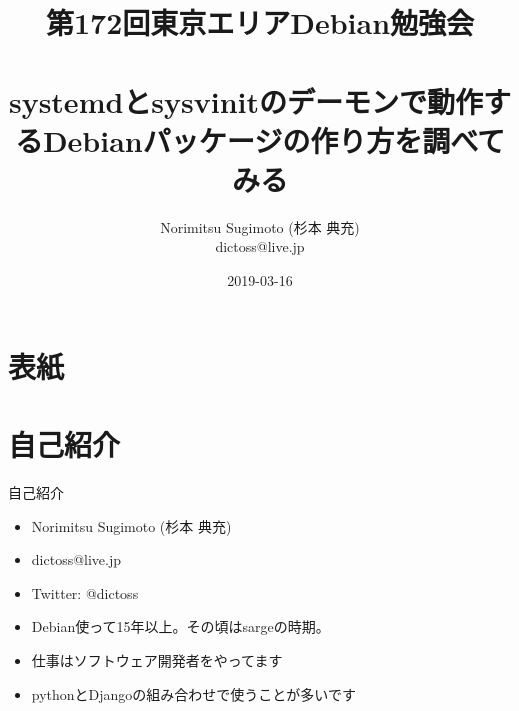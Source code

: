 \title{第172回東京エリアDebian勉強会 \\　\\systemdとsysvinitのデーモンで動作するDebianパッケージの作り方を調べてみる}
\subtitle{}
\author{Norimitsu Sugimoto (杉本 典充) \\dictoss@live.jp}
\date{2019-03-16}



\section{表紙}

\begin{frame}
  \titlepage{}
\end{frame}


\section{自己紹介}

\begin{frame}{自己紹介}
  \begin{itemize}
  \item Norimitsu Sugimoto (杉本 典充)
  \item dictoss@live.jp
  \item Twitter: @dictoss
  \item Debian使って15年以上。その頃はsargeの時期。
  \item 仕事はソフトウェア開発者をやってます
  \item pythonとDjangoの組み合わせで使うことが多いです
  \end{itemize}
\end{frame}


